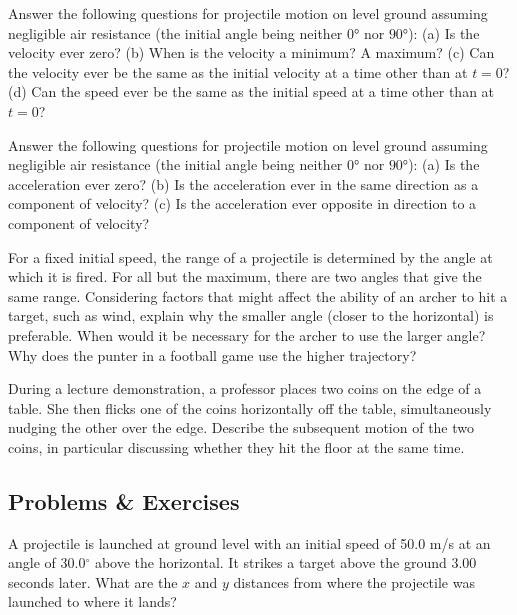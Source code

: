 \documentclass[
]{book}
\begin{document}
\hypertarget{fs-id2183300}{}
\leavevmode{}%
Answer the following questions for projectile motion on level ground
assuming negligible air resistance (the initial angle being neither
\(\text{0°}{}\) nor \(\text{90°}{}\)): (a) Is the velocity ever zero? (b)
When is the velocity a minimum? A maximum? (c) Can the velocity ever be
the same as the initial velocity at a time other than at \({t = 0}{}\)?
(d) Can the speed ever be the same as the initial speed at a time other
than at \({t = 0}{}\)?

\hypertarget{fs-id1638420}{}
\leavevmode{}%
Answer the following questions for projectile motion on level ground
assuming negligible air resistance (the initial angle being neither
\(\text{0°}{}\) nor \(\text{90°}{}\)): (a) Is the acceleration ever zero?
(b) Is the acceleration ever in the same direction as a component of
velocity? (c) Is the acceleration ever opposite in direction to a
component of velocity?

\hypertarget{fs-id2062475}{}
\leavevmode{}%
For a fixed initial speed, the range of a projectile is determined by
the angle at which it is fired. For all but the maximum, there are two
angles that give the same range. Considering factors that might affect
the ability of an archer to hit a target, such as wind, explain why the
smaller angle (closer to the horizontal) is preferable. When would it be
necessary for the archer to use the larger angle? Why does the punter in
a football game use the higher trajectory?

\hypertarget{fs-id1875651}{}
\leavevmode{}%
During a lecture demonstration, a professor places two coins on the edge
of a table. She then flicks one of the coins horizontally off the table,
simultaneously nudging the other over the edge. Describe the subsequent
motion of the two coins, in particular discussing whether they hit the
floor at the same time.

\hypertarget{fs-id1875655}{}
\hypertarget{problems-exercises-8}{%
\subsection{Problems \& Exercises}\label{problems-exercises-8}}

\hypertarget{fs-id1923898}{}
\leavevmode{}%
A projectile is launched at ground level with an initial speed of 50.0
m/s at an angle of \(30.0{^\circ}\) above the horizontal. It strikes a
target above the ground 3.00 seconds later. What are the \(x{}\) and \(y{}\)
distances from where the projectile was launched to where it lands?
\end{document}
